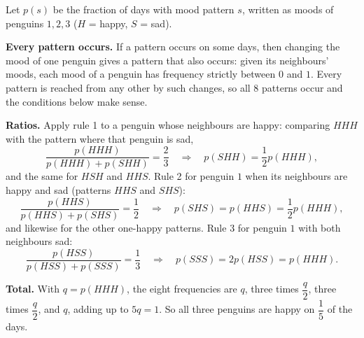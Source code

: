 Let $p(s)$ be the fraction of days with mood pattern $s$, written as moods of penguins $1,2,3$ ($H$ = happy, $S$ = sad).

\textbf{Every pattern occurs.} If a pattern occurs on some days, then changing the mood of one penguin gives a pattern that also occurs: given its neighbours' moods, each mood of a penguin has frequency strictly between $0$ and $1$. Every pattern is reached from any other by such changes, so all $8$ patterns occur and the conditions below make sense.

\textbf{Ratios.} Apply rule 1 to a penguin whose neighbours are happy: comparing $HHH$ with the pattern where that penguin is sad,
\[\dfrac{p(HHH)}{p(HHH)+p(SHH)}=\dfrac23\quad\Longrightarrow\quad p(SHH)=\dfrac12p(HHH),\]
and the same for $HSH$ and $HHS$. Rule 2 for penguin $1$ when its neighbours are happy and sad (patterns $HHS$ and $SHS$):
\[\dfrac{p(HHS)}{p(HHS)+p(SHS)}=\dfrac12\quad\Longrightarrow\quad p(SHS)=p(HHS)=\dfrac12p(HHH),\]
and likewise for the other one-happy patterns. Rule 3 for penguin $1$ with both neighbours sad:
\[\dfrac{p(HSS)}{p(HSS)+p(SSS)}=\dfrac13\quad\Longrightarrow\quad p(SSS)=2p(HSS)=p(HHH).\]

\textbf{Total.} With $q=p(HHH)$, the eight frequencies are $q$, three times $\dfrac q2$, three times $\dfrac q2$, and $q$, adding up to $5q=1$. So all three penguins are happy on $\boxed{\dfrac15}$ of the days.
